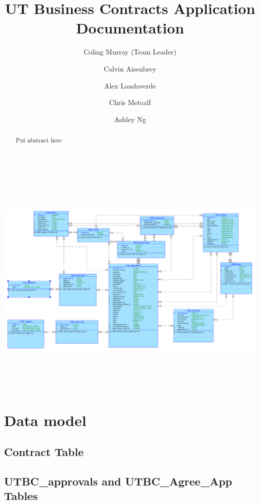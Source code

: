 \documentclass{report}
\begin{document}
\title{\bfseries UT Business Contracts Application Documentation}

\author{
	Coling Murray (Team Leader)
	\and
	Calvin Aisenbrey
	\and
	Alex Landaverde
	\and
	Chris Metcalf
	\and
	Ashley Ng
}

\maketitle

\begin{abstract}
Put abstract here
\end{abstract}

\tableofcontents

\newpage

\begin{image}
\centering
\includegraphics[height = 4.5in, angle = 90]{UTBC_model}
\end{image}



\chapter{Data model}

\section{Contract Table}

\section{UTBC\_approvals and UTBC\_Agree\_App Tables}
\end{document}
